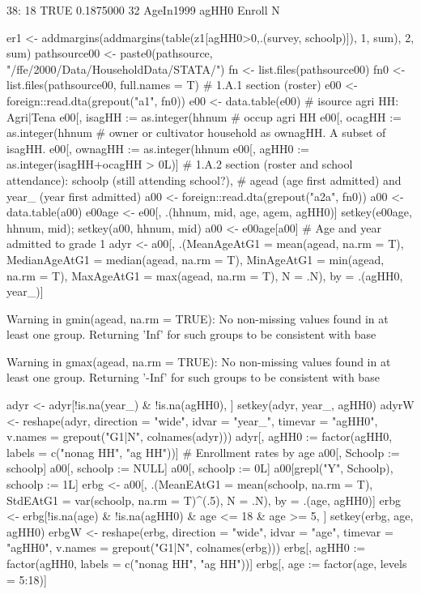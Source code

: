 \begin{Schunk}
\begin{Soutput}
38:        18  TRUE 0.1875000  32
    AgeIn1999 agHH0    Enroll   N
\end{Soutput}
\begin{Sinput}
er1 <- addmargins(addmargins(table(z1[agHH0>0,.(survey, schoolp)]), 1, sum), 2, sum)
pathsource00 <- paste0(pathsource, "/ffe/2000/Data/HouseholdData/STATA/")
fn <- list.files(pathsource00)
fn0 <- list.files(pathsource00, full.names = T)
# 1.A.1 section (roster)
e00 <- foreign::read.dta(grepout("a1", fn0))
e00 <- data.table(e00)
	#	isource agri HH: Agri|Tena
e00[, isagHH := as.integer(hhnum %in% hhnum[grep("^1$|^6[12]$", isource)])]
	#	occup agri HH
e00[, ocagHH := as.integer(hhnum %in% hhnum[grep("Agri|enan|farm", occup)])]
	#	owner or cultivator household as ownagHH. A subset of isagHH.
e00[, ownagHH := as.integer(hhnum %in% hhnum[grep("^6[12]$", isource)])]
e00[, agHH0 := as.integer(isagHH+ocagHH > 0L)]
# 1.A.2 section (roster and school attendance): schoolp (still attending school?), 
# agead (age first admitted) and year_ (year first admitted)
a00 <- foreign::read.dta(grepout("a2a", fn0))
a00 <- data.table(a00)
e00age <- e00[, .(hhnum, mid, age, agem, agHH0)]
setkey(e00age, hhnum, mid); setkey(a00, hhnum, mid)
a00 <- e00age[a00]
# Age and year admitted to grade 1
adyr <- a00[, .(MeanAgeAtG1 = mean(agead, na.rm = T), 
  MedianAgeAtG1 = median(agead, na.rm = T), 
  MinAgeAtG1 = min(agead, na.rm = T), 
  MaxAgeAtG1 = max(agead, na.rm = T), N = .N), by = .(agHH0, year_)]
\end{Sinput}
\begin{Soutput}
Warning in gmin(agead, na.rm = TRUE): No non-missing values found in at least one group. Returning 'Inf' for such groups to be consistent with base
\end{Soutput}
\begin{Soutput}
Warning in gmax(agead, na.rm = TRUE): No non-missing values found in at least one group. Returning '-Inf' for such groups to be consistent with base
\end{Soutput}
\begin{Sinput}
adyr <- adyr[!is.na(year_) & !is.na(agHH0), ]
setkey(adyr, year_, agHH0)
adyrW <- reshape(adyr, direction = "wide", idvar = "year_", timevar = "agHH0", 
  v.names = grepout("G1|N", colnames(adyr)))
adyr[, agHH0 := factor(agHH0, labels = c("nonag HH", "ag HH"))]
# Enrollment rates by age
a00[, Schoolp := schoolp]
a00[, schoolp := NULL]
a00[, schoolp := 0L]
a00[grepl("Y", Schoolp), schoolp := 1L]
erbg <- a00[, .(MeanEAtG1 = mean(schoolp, na.rm = T), 
  StdEAtG1 = var(schoolp, na.rm = T)^(.5), N = .N), by = .(age, agHH0)]
erbg <- erbg[!is.na(age) & !is.na(agHH0) & age <= 18 & age >= 5, ]
setkey(erbg, age, agHH0)
erbgW <- reshape(erbg, direction = "wide", idvar = "age", timevar = "agHH0", 
  v.names = grepout("G1|N", colnames(erbg)))
erbg[, agHH0 := factor(agHH0, labels = c("nonag HH", "ag HH"))]
erbg[, age := factor(age, levels = 5:18)]
\end{Sinput}
\end{Schunk}
